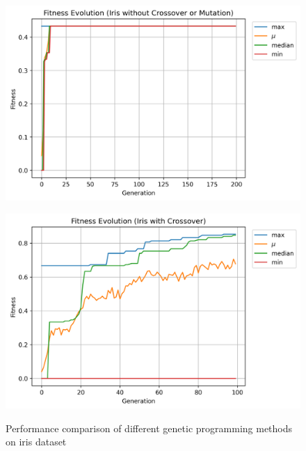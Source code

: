 \documentclass[12pt, final]{dalcsthesis}
\begin{document}
\begin{figure}[!htb]
	\centering
	\begin{subfloat}{\includegraphics[width=\textwidth]{iris_baseline.png}\label{fig:iris_baseline}}
	\end{subfloat}

	\begin{subfloat}{\includegraphics[width=\textwidth]{iris_crossover.png}\label{fig:iris_crossover}}
	\end{subfloat}

	\caption{Performance comparison of different genetic programming methods on iris dataset}
	\label{fig:iris_comparison}
\end{figure}
\end{document}
